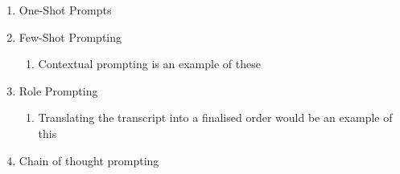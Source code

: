 \begin{enumerate}
    \item One-Shot Prompts
    \item Few-Shot Prompting
    \begin{enumerate}
        \item Contextual prompting is an example of these\end{enumerate}
    \item Role Prompting \begin{enumerate}
        \item  Translating the transcript into a finalised order would be an example of this \end{enumerate}
    \item Chain of thought prompting
\end{enumerate}

